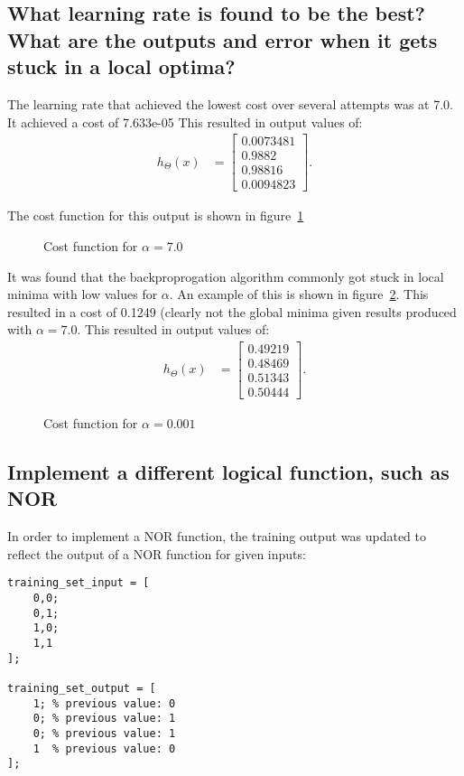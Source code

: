 \documentclass[titlepage]{scrartcl}
\begin{document}
\subsection{What learning rate is found to be the best? What are the outputs
and error when it gets stuck in a local optima?}
The learning rate that achieved the lowest cost over several attempts was at
7.0. It achieved a cost of 7.633e-05
This resulted in output values of:
\begin{align}
h_\Theta(x) &= \begin{bmatrix}
           0.0073481 \\
           0.9882 \\
           0.98816 \\
           0.0094823
         \end{bmatrix}.
\end{align}

The cost function for this output is shown in figure~\ref{LearnRate7}\\

\begin{figure}
    \caption{Cost function for $\alpha=7.0$}
    \label{LearnRate7}
\end{figure}

It was found that the backproprogation algorithm commonly got stuck in local
minima with low values for $\alpha$. An example of this is shown in
figure~\ref{LowLearnRateLocalOptima1}. This resulted in a cost of 0.1249
(clearly not the global minima given results produced with $\alpha=7.0$.
This resulted in output values of:
\begin{align}
h_\Theta(x) &= \begin{bmatrix}
            0.49219 \\
            0.48469 \\
            0.51343 \\
            0.50444
         \end{bmatrix}.
\end{align}

\begin{figure}
    \caption{Cost function for $\alpha=0.001$}
    \label{LowLearnRateLocalOptima1}
\end{figure}

\subsection{Implement a different logical function, such as NOR}
In order to implement a NOR function, the training output was updated to
reflect the output of a NOR function for given inputs:
\begin{lstlisting}
training_set_input = [
    0,0;
    0,1;
    1,0;
    1,1
];

training_set_output = [
    1; % previous value: 0
    0; % previous value: 1
    0; % previous value: 1
    1  % previous value: 0
];
\end{lstlisting}
\end{document}
